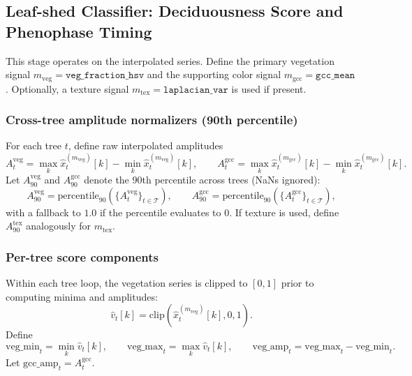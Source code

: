 \subsection{Leaf-shed Classifier: Deciduousness Score and Phenophase Timing}

This stage operates on the interpolated series. Define the primary vegetation signal
$m_\mathrm{veg}=\texttt{veg\_fraction\_hsv}$ and the supporting color signal
$m_\mathrm{gcc}=\texttt{gcc\_mean}$.
Optionally, a texture signal $m_\mathrm{tex}=\texttt{laplacian\_var}$ is used if present.

\subsubsection{Cross-tree amplitude normalizers (90th percentile)}

For each tree $t$, define raw interpolated amplitudes
\begin{equation}
A_t^{\mathrm{veg}} = \max_{k} \hat{x}^{(m_\mathrm{veg})}_t[k] - \min_{k} \hat{x}^{(m_\mathrm{veg})}_t[k],
\qquad
A_t^{\mathrm{gcc}} = \max_{k} \hat{x}^{(m_\mathrm{gcc})}_t[k] - \min_{k} \hat{x}^{(m_\mathrm{gcc})}_t[k].
\end{equation}
Let $A_{90}^{\mathrm{veg}}$ and $A_{90}^{\mathrm{gcc}}$ denote the 90th percentile across trees (NaNs ignored):
\begin{equation}
A_{90}^{\mathrm{veg}}=\mathrm{percentile}_{90}(\{A_t^{\mathrm{veg}}\}_{t\in\mathcal{T}}),
\qquad
A_{90}^{\mathrm{gcc}}=\mathrm{percentile}_{90}(\{A_t^{\mathrm{gcc}}\}_{t\in\mathcal{T}}),
\end{equation}
with a fallback to $1.0$ if the percentile evaluates to $0$.
If texture is used, define $A_{90}^{\mathrm{tex}}$ analogously for $m_\mathrm{tex}$.

\subsubsection{Per-tree score components}

Within each tree loop, the vegetation series is clipped to $[0,1]$ prior to computing minima and amplitudes:
\begin{equation}
\hat{v}_t[k] = \mathrm{clip}(\hat{x}^{(m_\mathrm{veg})}_t[k],0,1).
\end{equation}
Define
\begin{equation}
\mathrm{veg\_min}_t = \min_{k} \hat{v}_t[k],\qquad
\mathrm{veg\_max}_t = \max_{k} \hat{v}_t[k],\qquad
\mathrm{veg\_amp}_t = \mathrm{veg\_max}_t-\mathrm{veg\_min}_t.
\end{equation}
Let $\mathrm{gcc\_amp}_t=A_t^{\mathrm{gcc}}$.

